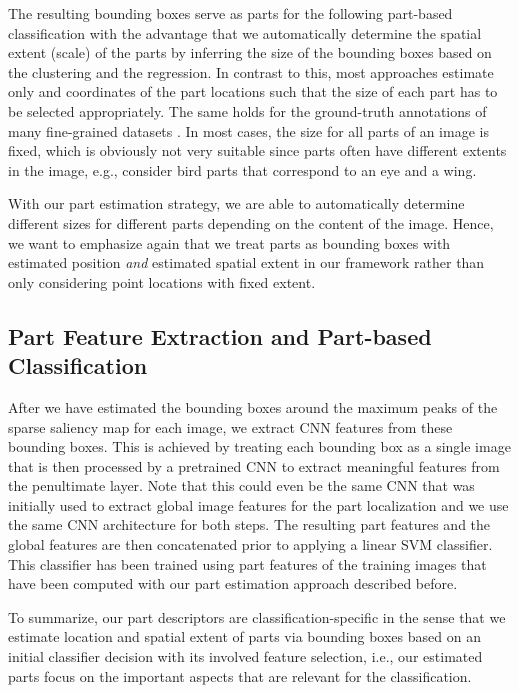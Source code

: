 \documentclass[runningheads]{llncs}
\begin{document}
The resulting bounding boxes serve as parts for the following part-based classification with the advantage that we automatically determine the spatial extent (scale) of the parts by inferring the size of the bounding boxes based on the clustering and the regression.
In contrast to this, most approaches estimate only  and  coordinates of the part locations such that the size of each part has to be selected appropriately.
The same holds for the ground-truth annotations of many fine-grained datasets \cite{NABirds,CUB_200_2011}.
In most cases, the size for all parts of an image is fixed, which is obviously not very suitable since parts often have different extents in the image, e.g., consider bird parts that correspond to an eye and a wing.

With our part estimation strategy, we are able to automatically determine different sizes for different parts depending on the content of the image.
Hence, we want to emphasize again that we treat parts as bounding boxes with estimated position \emph{and} estimated spatial extent in our framework rather than only considering point locations with fixed extent.

\subsection{Part Feature Extraction and Part-based Classification}
\label{sub:part_feature_extraction}

After we have estimated the bounding boxes around the maximum peaks of the sparse saliency map for each image, we extract CNN features from these bounding boxes.
This is achieved by treating each bounding box as a single image that is then processed by a pretrained CNN to extract meaningful features from the penultimate layer.
Note that this could even be the same CNN that was initially used to extract global image features for the part localization and we use the same CNN architecture for both steps.
The resulting part features and the global features are then concatenated prior to applying a linear SVM classifier.
This classifier has been trained using part features of the training images that have been computed with our part estimation approach described before.

To summarize, our part descriptors are classification-specific in the sense that we estimate location and spatial extent of parts via bounding boxes based on an initial classifier decision with its involved feature selection, i.e., our estimated parts focus on the important aspects that are relevant for the classification.
\end{document}
